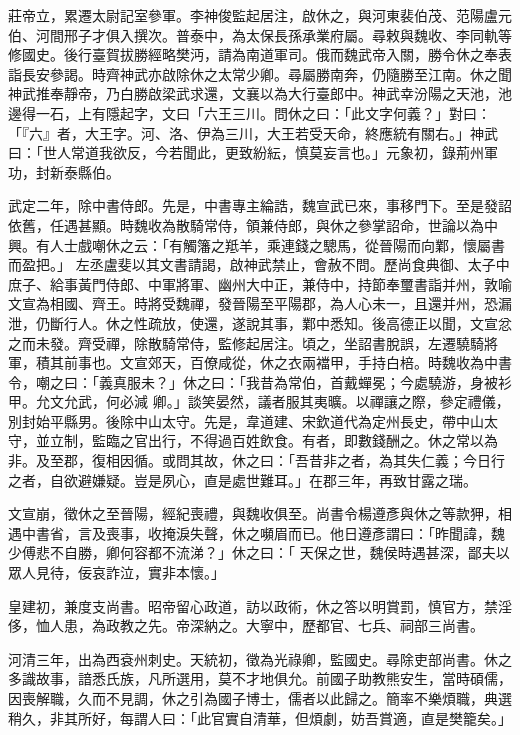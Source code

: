 \begin{pinyinscope}
 莊帝立，累遷太尉記室參軍。李神俊監起居注，啟休之，與河東裴伯茂、范陽盧元伯、河間邢子才俱入撰次。普泰中，為太保長孫承業府屬。尋敕與魏收、李同軌等修國史。後行臺賀拔勝經略樊沔，請為南道軍司。俄而魏武帝入關，勝令休之奉表詣長安參謁。時齊神武亦啟除休之太常少卿。尋屬勝南奔，仍隨勝至江南。休之聞
 神武推奉靜帝，乃白勝啟梁武求還，文襄以為大行臺郎中。神武幸汾陽之天池，池邊得一石，上有隱起字，文曰「六王三川。問休之曰：「此文字何義？」對曰：「『六』者，大王字。河、洛、伊為三川，大王若受天命，終應統有關右。」神武曰：「世人常道我欲反，今若聞此，更致紛紜，慎莫妄言也。」元象初，錄荊州軍功，封新泰縣伯。



 武定二年，除中書侍郎。先是，中書專主綸誥，魏宣武已來，事移門下。至是發詔依舊，任遇甚顯。時魏收為散騎常侍，領兼侍郎，與休之參掌詔命，世論以為中興。有人士戲嘲休之云：「有觸籓之羝羊，乘連錢之驄馬，從晉陽而向鄴，懷屬書而盈把。」
 左丞盧斐以其文書請謁，啟神武禁止，會赦不問。歷尚食典御、太子中庶子、給事黃門侍郎、中軍將軍、幽州大中正，兼侍中，持節奉璽書詣并州，敦喻文宣為相國、齊王。時將受魏禪，發晉陽至平陽郡，為人心未一，且還并州，恐漏泄，仍斷行人。休之性疏放，使還，遂說其事，鄴中悉知。後高德正以聞，文宣忿之而未發。齊受禪，除散騎常侍，監修起居注。頃之，坐詔書脫誤，左遷驍騎將軍，積其前事也。文宣郊天，百僚咸從，休之衣兩襠甲，手持白棓。時魏收為中書令，嘲之曰：「義真服未？」休之曰：「我昔為常伯，首戴蟬冕；今處驍游，身被衫甲。允文允武，何必減
 卿。」談笑晏然，議者服其夷曠。以禪讓之際，參定禮儀，別封始平縣男。後除中山太守。先是，韋道建、宋欽道代為定州長史，帶中山太守，並立制，監臨之官出行，不得過百姓飲食。有者，即數錢酬之。休之常以為非。及至郡，復相因循。或問其故，休之曰：「吾昔非之者，為其失仁義；今日行之者，自欲避嫌疑。豈是夙心，直是處世難耳。」在郡三年，再致甘露之瑞。



 文宣崩，徵休之至晉陽，經紀喪禮，與魏收俱至。尚書令楊遵彥與休之等款狎，相遇中書省，言及喪事，收掩淚失聲，休之嚬眉而已。他日遵彥謂曰：「昨聞諱，魏少傅悲不自勝，卿何容都不流涕？」休之曰：「
 天保之世，魏侯時遇甚深，鄙夫以眾人見待，佞哀詐泣，實非本懷。」



 皇建初，兼度支尚書。昭帝留心政道，訪以政術，休之答以明賞罰，慎官方，禁淫侈，恤人患，為政教之先。帝深納之。大寧中，歷都官、七兵、祠部三尚書。



 河清三年，出為西袞州刺史。天統初，徵為光祿卿，監國史。尋除吏部尚書。休之多識故事，諳悉氏族，凡所選用，莫不才地俱允。前國子助教熊安生，當時碩儒，因喪解職，久而不見調，休之引為國子博士，儒者以此歸之。簡率不樂煩職，典選稍久，非其所好，每謂人曰：「此官實自清華，但煩劇，妨吾賞適，直是樊籠矣。」




\end{pinyinscope}
